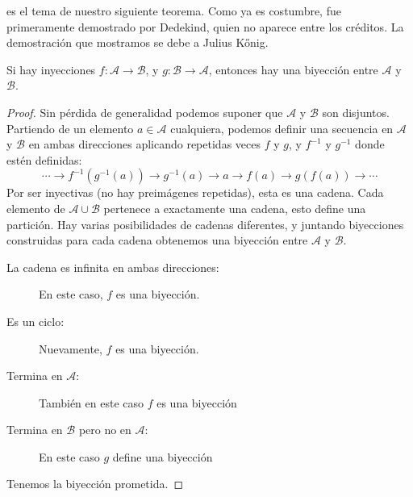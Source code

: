   es el tema de nuestro siguiente teorema.
  Como ya es costumbre,
  fue primeramente demostrado por Dedekind,%
  quien no aparece entre los créditos.
  La demostración que mostramos se debe a Julius Kőnig.%
  \begin{theorem}
    \label{theo:Cantor-Bernstein-Schroeder}
    Si hay inyecciones
      \(f \colon \mathcal{A} \rightarrow \mathcal{B}\),
    y \(g \colon \mathcal{B} \rightarrow \mathcal{A}\),
    entonces hay una biyección
    entre \(\mathcal{A}\) y \(\mathcal{B}\).
  \end{theorem}
  \begin{proof}
    Sin pérdida de generalidad podemos suponer que \(\mathcal{A}\)
    y \(\mathcal{B}\) son disjuntos.
    Partiendo de un elemento \(a \in \mathcal{A}\) cualquiera,
    podemos definir
    una secuencia en \(\mathcal{A}\) y \(\mathcal{B}\)
    en ambas direcciones
    aplicando repetidas veces \(f\) y \(g\),
    y \(f^{-1}\) y \(g^{-1}\) donde estén definidas:
    \begin{equation*}
      \cdots \rightarrow f^{-1}(g^{-1}(a))
	     \rightarrow g^{-1}(a)
	     \rightarrow a
	     \rightarrow f(a)
	     \rightarrow g(f(a))
	     \rightarrow \cdots
    \end{equation*}
    Por ser inyectivas
    (no hay preimágenes repetidas),
    esta es una cadena.
    Cada elemento de \(\mathcal{A} \cup \mathcal{B}\)
    pertenece a exactamente una cadena,
    esto define una partición.
    Hay varias posibilidades de cadenas diferentes,
    y juntando biyecciones construidas para cada cadena
    obtenemos una biyección entre \(\mathcal{A}\) y \(\mathcal{B}\).
    \begin{description}
    \item[La cadena es infinita en ambas direcciones:]
      En este caso,
      \(f\) es una biyección.
    \item[Es un ciclo:]
      Nuevamente,
      \(f\) es una biyección.
    \item[\boldmath Termina en \(\mathcal{A}\):\unboldmath]
      También en este caso \(f\) es una biyección
    \item[\boldmath Termina en \(\mathcal{B}\)
	  pero no en \(\mathcal{A}\):\unboldmath]
      En este caso \(g\) define una biyección
    \end{description}
    Tenemos la biyección prometida.
  \end{proof}

